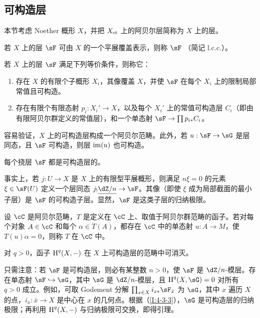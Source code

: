 \subsection{可构造层}\label{I:4-3}
本节考虑 Noether 概形 $X$，并把 ${X}_{\textnormal{et}}$ 上的阿贝尔层简称为 $X$ 上的层。
\begin{definition}\label{I:4-3-1}
若 $X$ 上的层 $\sF$ 可由 $X$ 的一个平展覆盖表示，则称 $\sF$ （简记 l.c.c.）。
\end{definition}
\begin{definition}\label{I:4-3-2}
若 $X$ 上的层 $\sF$ 满足下列等价条件，则称它：
\begin{enumerate}[\indent (i)]
\item 存在 $X$ 的有限个子概形 $X_i$，其像覆盖 $X$，并使 $\sF$ 在每个 $X_i$ 上的限制局部常值且可构造。
\item 存在有限个有限态射 $p_i:X_i'\to X$，以及每个 $X_i'$ 上的常值可构造层 $C_i$（即由有限阿贝尔群定义的常值层），和一个单态射 $\sF\to\prod p_{i*}C_i$。
\end{enumerate}
\end{definition}
容易验证，$X$ 上的可构造层构成一个阿贝尔范畴。此外，若 $u:\sF\to\sG$ 是层同态，且 $\sF$ 可构造，则层 $\operatorname{im}(u)$ 也可构造。
\begin{lemma}\label{I:4-3-3}
每个挠层 $\sF$ 都是可构造层的。
\end{lemma}
事实上，若 $j:U\to X$ 是 $X$ 上的有限型平展概形，则满足 $n\xi=0$ 的元素 $\xi\in\sF(U)$ 定义一个层同态 $j_!\const{\dZ/n}\to\sF$。其像（即使 $\xi$ 成为局部截面的最小子层）是 $\sF$ 的可构造子层。显然，$\sF$ 是这类子层的归纳极限。
\begin{definition}\label{I:4-3-4}
设 $\cC$ 是阿贝尔范畴，$T$ 是定义在 $\cC$ 上、取值于阿贝尔群范畴的函子。若对每个对象 $A\in\cC$ 和每个 $\alpha\in T(A)$，都存在 $\cC$ 中的单态射 $u:A\to M$，使 $T(u)\alpha=0$，则称 $T$ 在 $\cC$ 中。
\end{definition}
\begin{lemma}\label{I:4-3-5}
对 $q>0$，函子 $\operatorname{H}^q(X,-)$ 在 $X$ 上可构造层的范畴中可消灭。
\end{lemma}
只需注意：若 $\sF$ 是可构造层，则必有某整数 $n>0$，使 $\sF$ 是 $\dZ/n$-模层。存在单态射 $\sF\hookrightarrow\sG$，其中 $\sG$ 是 $\dZ/n$-模层，且 $\h^q(X,\sG)=0$ 对所有 $q>0$ 成立。例如，可取 Godement 分解 $\prod_{x\in X}i_{x*}\sF_{\bar x}$ 为 $\sG$，其中 $x$ 遍历 $X$ 的点，$i_x:\bar x\to X$ 是中心在 $x$ 的几何点。根据（\ref{I:4-3-3}），$\sG$ 是可构造层的归纳极限；再利用 $\operatorname{H}^q(X,-)$ 与归纳极限可交换，即得引理。
